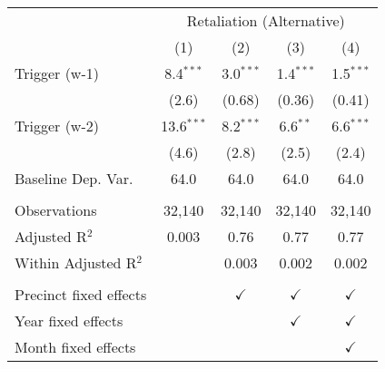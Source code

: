\begingroup \centering \begin{tabular}{lcccc}    \toprule     & \multicolumn{4}{c}{Retaliation (Alternative)}\\                           & (1)          & (2)           & (3)           & (4)\\      \midrule     Trigger (w-1)          & 8.4$^{***}$  & 3.0$^{***}$   & 1.4$^{***}$   & 1.5$^{***}$\\                              & (2.6)        & (0.68)        & (0.36)        & (0.41)\\       Trigger (w-2)          & 13.6$^{***}$ & 8.2$^{***}$   & 6.6$^{**}$    & 6.6$^{***}$\\                              & (4.6)        & (2.8)         & (2.5)         & (2.4)\\       Baseline Dep. Var.     & 64.0         & 64.0          & 64.0          & 64.0\\       \\    Observations           & 32,140       & 32,140        & 32,140        & 32,140\\      Adjusted R$^2$         & 0.003        & 0.76          & 0.77          & 0.77\\      Within Adjusted R$^2$  &              & 0.003         & 0.002         & 0.002\\       \\    Precinct fixed effects &              & $\checkmark$  & $\checkmark$  & $\checkmark$\\       Year fixed effects     &              &               & $\checkmark$  & $\checkmark$\\       Month fixed effects    &              &               &               & $\checkmark$\\       \bottomrule \end{tabular} \par\endgroup